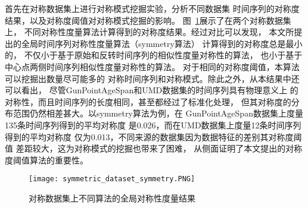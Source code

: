 首先在对称数据集上进行对称模式挖掘实验，分析不同数据集
时间序列的对称度结果，以及对称度阈值对对称模式挖掘的影响。
图~\ref{fig:symmetry_compare}展示了在两个对称数据集上，
不同对称性度量算法计算得到的对称度结果。经过对比可以发现，
本文所提出的全局时间序列对称性度量算法（symmetry算法）
计算得到的对称度总是最小的，
不仅小于基于原始和反转时间序列的相似性度量对称性的算法，
也小于基于中心点两侧时间序列相似性度量对称性的算法。
对于相同的对称度阈值，本算法可以挖掘出数量尽可能多的
对称时间序列和对称模式。除此之外，从本结果中还可以看出，
尽管GunPointAgeSpan和UMD数据集的时间序列具有物理意义上
的对称性，而且时间序列的长度相同，甚至都经过了标准化处理，
但其对称度的分布范围仍然相差甚大。以symmetry算法为例，在
GunPointAgeSpan数据集上度量135条时间序列得到的平均对称度
是0.026，而在UMD数据集上度量12条时间序列得到的平均对称度
仅为0.013，不同来源的数据集因为数据特征的差别其对称度阈值
差距较大，这为对称模式的挖掘也带来了困难，
从侧面证明了本文提出的对称度阈值算法的重要性。
\begin{figure}
  \centering
  \texttt{[image: symmetric\_dataset\_symmetry.PNG]}
  \caption{对称数据集上不同算法的全局对称性度量结果}
  \label{fig:symmetry_compare}
\end{figure}

